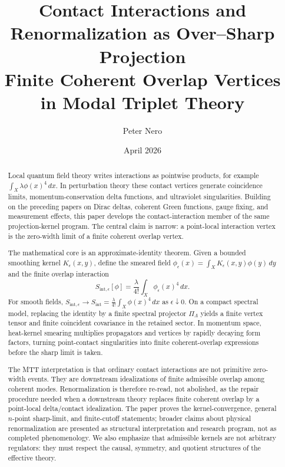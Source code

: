 \documentclass[11pt]{article}
\title{Contact Interactions and Renormalization as Over--Sharp Projection\\
\large Finite Coherent Overlap Vertices in Modal Triplet Theory}
\author{Peter Nero}
\date{April 2026}
\begin{document}
\maketitle

\begin{abstract}
Local quantum field theory writes interactions as pointwise products, for example
\(\int_X \lambda \phi(x)^4\,dx\).  In perturbation theory these contact vertices generate
coincidence limits, momentum-conservation delta functions, and ultraviolet singularities.
Building on the preceding papers on Dirac deltas, coherent Green functions, gauge fixing, and
measurement effects, this paper develops the contact-interaction member of the same
projection-kernel program.  The central claim is narrow: a point-local interaction vertex is the
zero-width limit of a finite coherent overlap vertex.

The mathematical core is an approximate-identity theorem.  Given a bounded smoothing
kernel \(K_\epsilon(x,y)\), define the smeared field
\(\phi_\epsilon(x)=\int_X K_\epsilon(x,y)\phi(y)\,dy\) and the finite overlap interaction
\[
S_{\mathrm{int},\epsilon}[\phi]
  = \frac{\lambda}{4!}\int_X \phi_\epsilon(x)^4\,dx .
\]
For smooth fields, \(S_{\mathrm{int},\epsilon}\to S_{\mathrm{int}}=
\frac{\lambda}{4!}\int_X\phi(x)^4\,dx\) as \(\epsilon\downarrow0\).  On a compact spectral
model, replacing the identity by a finite spectral projector \(\Pi_\Lambda\) yields a finite
vertex tensor and finite coincident covariance in the retained sector.  In momentum space,
heat-kernel smearing multiplies propagators and vertices by rapidly decaying form factors,
turning point-contact singularities into finite coherent-overlap expressions before the sharp
limit is taken.

The MTT interpretation is that ordinary contact interactions are not primitive zero-width
events.  They are downstream idealizations of finite admissible overlap among coherent
modes.  Renormalization is therefore re-read, not abolished, as the repair procedure needed
when a downstream theory replaces finite coherent overlap by a point-local delta/contact
idealization.  The paper proves the kernel-convergence, general \(n\)-point sharp-limit, and finite-cutoff statements; broader
claims about physical renormalization are presented as structural interpretation and research
program, not as completed phenomenology.  We also emphasize that admissible kernels are not arbitrary regulators: they must respect the causal, symmetry, and quotient structures of the effective theory.
\end{abstract}
\end{document}
